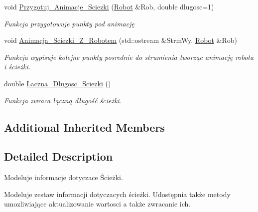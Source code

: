 \begin{DoxyCompactItemize}
void \hyperlink{class_sciezka_a7d748699e2bf7940d76361b66b4fedba}{Przygotuj\+\_\+\+Animacje\+\_\+\+Sciezki} (\hyperlink{class_robot}{Robot} \&Rob, double dlugosc=1)
\begin{DoxyCompactList}\small\item\em Funkcja przygotowuje punkty pod animację \end{DoxyCompactList}\item 
void \hyperlink{class_sciezka_af673870927f8b8e88b1e31b8bb018de3}{Animacja\+\_\+\+Sciezki\+\_\+\+Z\+\_\+\+Robotem} (std\+::ostream \&Strm\+Wy, \hyperlink{class_robot}{Robot} \&Rob)
\begin{DoxyCompactList}\small\item\em Funkcja wypisuje kolejne punkty posrednie do strumienia tworząc animację robota i ścieżki. \end{DoxyCompactList}\item 
\hypertarget{class_sciezka_a3129be908dfd809c4c9339605e21e775}{double \hyperlink{class_sciezka_a3129be908dfd809c4c9339605e21e775}{Laczna\+\_\+\+Dlugosc\+\_\+\+Sciezki} ()}\label{class_sciezka_a3129be908dfd809c4c9339605e21e775}

\begin{DoxyCompactList}\small\item\em Funkcja zwraca łączną długość ścieżki. \end{DoxyCompactList}\end{DoxyCompactItemize}
\subsection*{Additional Inherited Members}


\subsection{Detailed Description}
Modeluje informacje dotyczace Ścieżki. 

Modeluje zestaw informacji dotyczacych ścieżki. Udostępnia także metody umozliwiające aktualizowanie wartosci a także zwracanie ich. 

